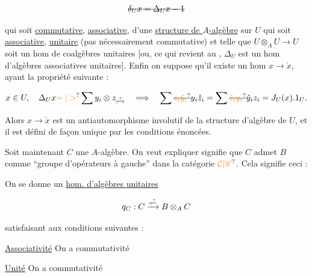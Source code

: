 
\[
\deleted{\delta_U x=\Delta_U x-1}
\]

qui soit \uline{commutative}, \uline{associative}, d'une \uline{structure de $A$-algèbre} sur $U$ qui soit \uline{associative}, \uline{unitaire} (pas nécessairement commutative) et telle que $U\otimes_A U\to U$ soit un hom de coalgèbres unitaires [ou, ce qui revient au , $\Delta_U$ est un hom d'algèbres associatives unitaires]. Enfin on suppose qu'il existe un hom  $x\to\check{x}$, ayant la propriété suivante :

\[
x\in U,\quad \Delta_U x\unsure{=|>}\sum y_i\otimes z_{\deleted{\unsure{j}}i}
\quad\Longrightarrow\quad \sum\deleted{\unsure{z_i\check{y}_i}}y_i\check{z}_i=\sum\deleted{\unsure{\check{z}_i y_i}}\check{y}_i z_i=J_U(x).1_U.
\]

Alors $x\to\check{x}$ est un antiautomorphisme involutif de la structure d'algèbre de $U$, et  il est défini de façon unique par les conditions énoncées.

Soit maintenant $C$ une $A$-algèbre. On veut expliquer  signifie que $C$ admet $B$ comme ``groupe d'opérateurs à  gauche'' dans la catégorie $\unsure{\mathcal{C}|\mathscr{C}}$. Cela signifie ceci :


On se donne un \uline{hom. d'algèbres unitaires}

\[
q_C:C\xrightarrow{\deleted{\unsure{a}}}B\otimes_A C
\]

satisfaisant aux conditions suivantes :

\uline{Associativité} On a commutativité 


\uline{Unité} On a commutativité 


